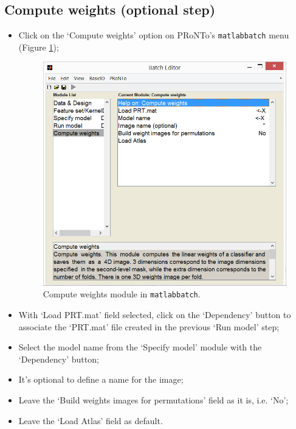 \subsection{Compute weights (optional step)}

\begin{itemize}

	\item Click on the `Compute weights' option on PRoNTo's {\tt matlabbatch} menu (Figure \ref{fig:batchWeights});
	
	\begin{figure}[h!]
	\centering
		\includegraphics[scale=0.6]{images/Tutorial/classification/batchWeights.png}
	\caption{Compute weights module in {\tt matlabbatch}.}
	\label{fig:batchWeights}
\end{figure}

	\item With `Load PRT.mat' field selected, click on the `Dependency' button to associate the `PRT.mat' file created in the previous `Run model' step;
	
	\item Select the model name from the `Specify model' module with the `Dependency' button;
	
	\item It's optional to define a name for the image; 
	
	\item Leave the `Build weights images for permutations' field as it is, i.e. `No'; 
	
	\item Leave the `Load Atlas' field as default.

\end{itemize}

